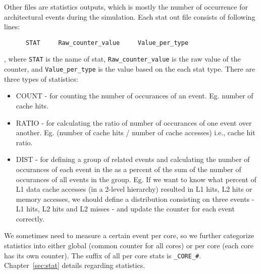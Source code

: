 \ignore
	  {
	  Other files are statistics outputs, which is mostly the number
	  of occurrence for architectural events during the simulation. Each
	  stat out file consists of following lines:

	  \begin{Verbatim}
	  STAT     Raw_counter_value     Value_per_type
	  \end{Verbatim}

	  \noindent
	  , where \Verb+STAT+ is the name of stat, \Verb+Raw_counter_value+ is
	  the raw value of the counter, and \Verb+Value_per_type+ is the value
	  based on the each stat type. There are three types of statistics:

	  \begin{itemize}

		\item COUNT - for counting the number of occurances of an event. Eg. number
		of cache hits. 

		\item RATIO - for calculating the ratio of number of occurances of one event
		over another. Eg. (number of cache hits / number of cache accesses) i.e.,
		cache hit ratio.

		\item DIST - for defining a group of related events and calculating the
		number of occurances of each event in the as a percent of the sum of the
		number of occurances of all events in the group.  Eg. If we want to know what
		percent of L1 data cache accesses (in a 2-level hierarchy) resulted in L1
		hits, L2 hits or memory accesses, we should define a distribution consisting
		on three events - L1 hits, L2 hits and L2 misses  - and update the
		counter for each event correctly. 
	  \end{itemize}


	  \noindent
	  We sometimes need to measure a certain event per core, so we further
	  categorize statistics into either global (common counter for all
	  cores) or per core (each core has its own counter). The suffix of all
	  per core stats is \Verb+_CORE_#+. Chapter~\ref{sec:stat} details
	  regarding statistics.


}
